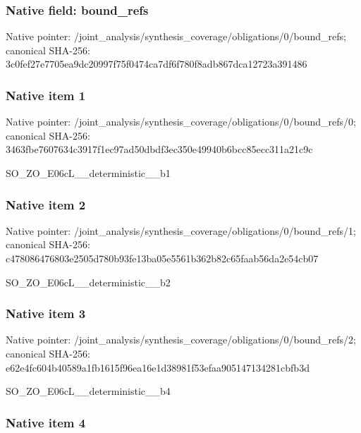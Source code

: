 \documentclass[10pt,a4paper]{article}
\begin{document}
\subsubsection{Native field: bound\_refs}


Native pointer: /joint\_analysis/synthesi\allowbreak{}s\_coverage/obligations/0\allowbreak{}/bound\_refs; canonical SHA-256: 3c0fef27e7705ea9dc20997f\allowbreak{}75f0474ca7df6f780f8adb86\allowbreak{}7dca12723a391486



\subsubsection{Native item 1}


Native pointer: /joint\_analysis/synthesi\allowbreak{}s\_coverage/obligations/0\allowbreak{}/bound\_refs/0; canonical SHA-256: 3463fbe7607634c3917f1ec9\allowbreak{}7ad50dbdf3ec350e49940b6b\allowbreak{}cc85ecc311a21c9c


SO\_ZO\_E06cL\_\_deterministic\_\_b1


\subsubsection{Native item 2}


Native pointer: /joint\_analysis/synthesi\allowbreak{}s\_coverage/obligations/0\allowbreak{}/bound\_refs/1; canonical SHA-256: c478086476803e2505d780b9\allowbreak{}3fe13ba05e5561b362b82c65\allowbreak{}faab56da2e54cb07


SO\_ZO\_E06cL\_\_deterministic\_\_b2


\subsubsection{Native item 3}


Native pointer: /joint\_analysis/synthesi\allowbreak{}s\_coverage/obligations/0\allowbreak{}/bound\_refs/2; canonical SHA-256: e62e4fc604b40589a1fb1615\allowbreak{}f96ea16e1d38981f53efaa90\allowbreak{}5147134281cbfb3d


SO\_ZO\_E06cL\_\_deterministic\_\_b4


\subsubsection{Native item 4}
\end{document}
